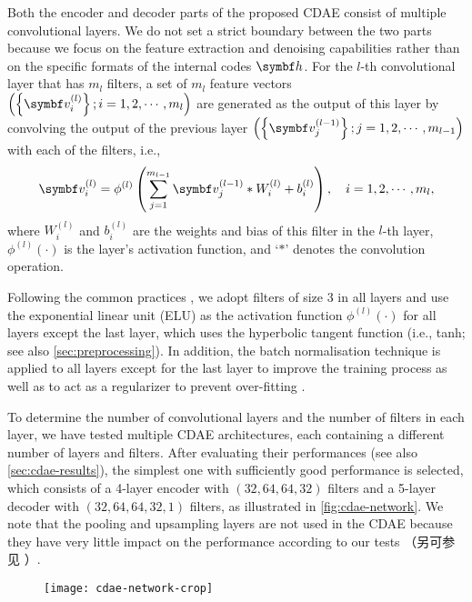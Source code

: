 Both the encoder and decoder parts of the proposed CDAE consist of multiple
convolutional layers.
We do not set a strict boundary between the two parts
because we focus on the feature extraction and denoising capabilities
rather than on the specific formats of the internal codes $\B{h}$.
For the $l$-th convolutional layer that has $m_l$ filters, a set of $m_l$
feature vectors
$\left(\left\{ \B{v}_{i}^{(l)} \right\}; i = 1, 2, \cdots, m_l \right)$
are generated as the output of this layer by convolving the output of the
previous layer
$\left(\left\{ \B{v}_{j}^{(l-1)} \right\}; j = 1, 2, \cdots, m_{l-1} \right)$
with each of the filters, i.e.,
\begin{equation}
  \label{eq:conv}
  \B{v}_{i}^{(l)} = \phi^{(l)} \left( \sum_{j=1}^{m_{l-1}}
    \B{v}_{j}^{(l-1)} * W_i^{(l)} + b_i^{(l)} \right),
    \quad i = 1, 2, \cdots, m_{l},
\end{equation}
where
$W_i^{(l)}$ and $b_i^{(l)}$ are the weights and bias of this filter
in the $l$-th layer, $\phi^{(l)}(\cdot)$ is the layer's activation
function, and `$*$' denotes the convolution operation.

Following the common practices \cite{geron2017,suganuma2018},
we adopt filters of size 3 in all layers and use the exponential linear
unit (ELU) \cite{clevert2016} as the activation function
$\phi^{(l)}(\cdot)$ for all layers except the last layer, which uses
the hyperbolic tangent function (i.e., tanh;
see also \autoref{sec:preprocessing}).
In addition, the batch normalisation technique is applied to all layers
except for the last layer to improve the training process as well as to act
as a regularizer to prevent over-fitting \cite{ioffe2015}.

To determine the number of convolutional layers and the number of filters
in each layer, we have tested multiple CDAE architectures, each containing
a different number of layers and filters.
After evaluating their performances (see also \autoref{sec:cdae-results}),
the simplest one with sufficiently good performance is selected,
which consists of a 4-layer encoder with $(32,64,64,32)$ filters and
a 5-layer decoder with $(32,64,64,32,1)$ filters, as illustrated in
\autoref{fig:cdae-network}.
We note that the pooling and upsampling layers are not used in the CDAE
because they have very little impact on the performance according to our
tests
（另可参见 ）.

\begin{figure}[htp]
  \centering
  \texttt{[image: cdae-network-crop]}
  \label{fig:cdae-network}
\end{figure}

